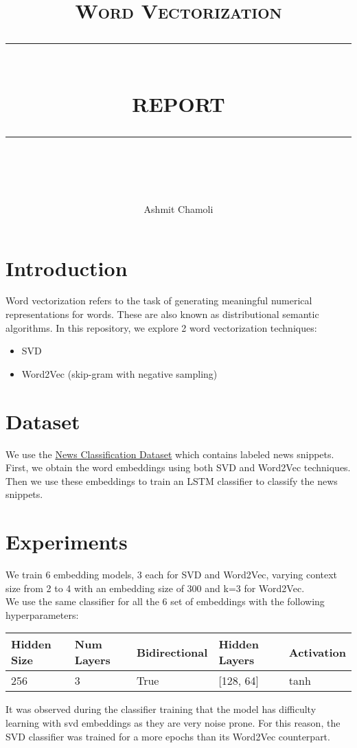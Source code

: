 \documentclass[a4paper,9pt]{report}
\newcommand{\HRule}[1]{\rule{\linewidth}{#1}}
\begin{document}
\title{ \normalsize \textsc{\LARGE Word Vectorization}
		\\ [2.0cm]
		\HRule{0.5pt} \\
		\LARGE \textbf{\uppercase{Report}}
		\HRule{2pt} \\ [0.5cm]
		\normalsize \vspace*{3\baselineskip}}
        \date{ }

\author{Ashmit Chamoli\\ }

\maketitle
\section*{Introduction}
Word vectorization refers to the task of generating meaningful numerical representations for words. These are also known as distributional semantic algorithms.
In this repository, we explore 2 word vectorization techniques:
\begin{itemize}
    \item SVD
    \item Word2Vec (skip-gram with negative sampling)
\end{itemize}

\section*{Dataset}
We use the \href{https://iiitaphyd-my.sharepoint.com/:u:/g/personal/advaith_malladi_research_iiit_ac_in/EWjgIboHC19Ppq6Of9klUo4BlKgAqynxC0TRBURzQ0lEzA?e=tWZqY5}{News Classification Dataset} which contains labeled news snippets. 
First, we obtain the word embeddings using both SVD and Word2Vec techniques. 
Then we use these embeddings to train an LSTM classifier to classify the news snippets.

\section*{Experiments}
We train 6 embedding models, 3 each for SVD and Word2Vec, varying context size from 2 to 4 with an embedding size of 300 and k=3 for Word2Vec.
\\
We use the same classifier for all the 6 set of embeddings with the following hyperparameters:
\begin{table}[H]
    \centering
    \begin{tabular}{|l|l|l|l|l|}
        \hline
        \textbf{Hidden Size} & \textbf{Num Layers} & \textbf{Bidirectional} & \textbf{Hidden Layers} & \textbf{Activation} \\ \hline
        256 & 3 & True & [128, 64] & tanh \\ \hline
    \end{tabular}
\end{table}
It was observed during the classifier training that the model has difficulty learning with svd embeddings as they are very noise prone. For this reason, the SVD classifier was trained for a more epochs than its Word2Vec counterpart.
\end{document}
